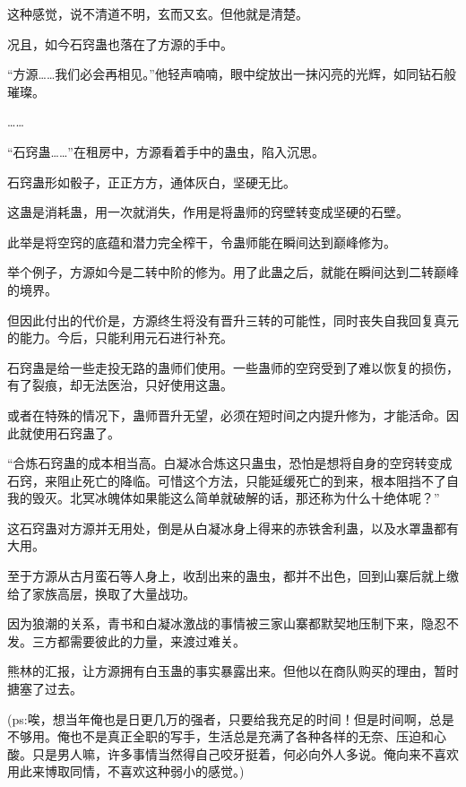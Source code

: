 \begin{this_body}
这种感觉，说不清道不明，玄而又玄。但他就是清楚。

况且，如今石窍蛊也落在了方源的手中。

“方源……我们必会再相见。”他轻声喃喃，眼中绽放出一抹闪亮的光辉，如同钻石般璀璨。

……

“石窍蛊……”在租房中，方源看着手中的蛊虫，陷入沉思。

石窍蛊形如骰子，正正方方，通体灰白，坚硬无比。

这蛊是消耗蛊，用一次就消失，作用是将蛊师的窍壁转变成坚硬的石壁。

此举是将空窍的底蕴和潜力完全榨干，令蛊师能在瞬间达到巅峰修为。

举个例子，方源如今是二转中阶的修为。用了此蛊之后，就能在瞬间达到二转巅峰的境界。

但因此付出的代价是，方源终生将没有晋升三转的可能性，同时丧失自我回复真元的能力。今后，只能利用元石进行补充。

石窍蛊是给一些走投无路的蛊师们使用。一些蛊师的空窍受到了难以恢复的损伤，有了裂痕，却无法医治，只好使用这蛊。

或者在特殊的情况下，蛊师晋升无望，必须在短时间之内提升修为，才能活命。因此就使用石窍蛊了。

“合炼石窍蛊的成本相当高。白凝冰合炼这只蛊虫，恐怕是想将自身的空窍转变成石窍，来阻止死亡的降临。可惜这个方法，只能延缓死亡的到来，根本阻挡不了自我的毁灭。北冥冰魄体如果能这么简单就破解的话，那还称为什么十绝体呢？”

这石窍蛊对方源并无用处，倒是从白凝冰身上得来的赤铁舍利蛊，以及水罩蛊都有大用。

至于方源从古月蛮石等人身上，收刮出来的蛊虫，都并不出色，回到山寨后就上缴给了家族高层，换取了大量战功。

因为狼潮的关系，青书和白凝冰激战的事情被三家山寨都默契地压制下来，隐忍不发。三方都需要彼此的力量，来渡过难关。

熊林的汇报，让方源拥有白玉蛊的事实暴露出来。但他以在商队购买的理由，暂时搪塞了过去。

(ps:唉，想当年俺也是日更几万的强者，只要给我充足的时间！但是时间啊，总是不够用。俺也不是真正全职的写手，生活总是充满了各种各样的无奈、压迫和心酸。只是男人嘛，许多事情当然得自己咬牙挺着，何必向外人多说。俺向来不喜欢用此来博取同情，不喜欢这种弱小的感觉。)

\end{this_body}

